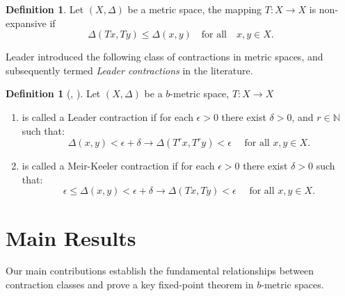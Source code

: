 \documentclass{birkjour}
\theoremstyle{definition}
\newtheorem{defn}[thm]{Definition}
\theoremstyle{remark}
\numberwithin{equation}{section}
\begin{document}
\begin{defn}Let $(X,\Delta)$ be a metric space, the mapping $T:X\to X$ is non-expansive if 
\[
\Delta(Tx,Ty)\leq \Delta(x,y)\quad \text{for all}\quad x,y\in X.
\]
\end{defn}
Leader \cite{leader1983equivalent} introduced the following class of contractions in metric spaces, and subsequently termed \emph{Leader contractions} in the literature. 
\begin{defn}[\cite{keeler1969theorem}, \cite{leader1983equivalent} ]Let $(X,\Delta)$ be a $b$-metric space, $T:X\to X$ 
\begin{enumerate}
\item is called a Leader contraction if for each $\epsilon>0$ there exist $\delta>0$, and $r\in \mathbb {N}$ such that:
\[
\Delta(x,y)<\epsilon+\delta \rightarrow  \Delta(T^{r}x,T^{r}y)<\epsilon \quad \text{ for all } x,y\in X.
\]
\item  is called a Meir-Keeler contraction if for each $\epsilon>0$ there exist $\delta>0$ such that:
\[
\epsilon \leq \Delta(x,y)<\epsilon+\delta \rightarrow  \Delta(Tx,Ty)<\epsilon \quad \text{ for all } x,y\in X.
\]
\end{enumerate}
\end{defn}
\section{Main Results}\label{mai-res}
Our main contributions establish the fundamental relationships between contraction classes and prove a key fixed-point theorem in $b$-metric spaces.
\end{document}
